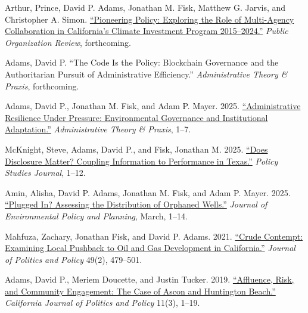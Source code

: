 \documentclass[12pt,letterpaper]{article}
\renewenvironment{itemize}{
  \begin{list}{}{
    \setlength{\leftmargin}{1.5em}
    \setlength{\itemsep}{0.25em}
    \setlength{\parskip}{0pt}
    \setlength{\parsep}{0.25em}
  }
}{
  \end{list}
}
\begin{document}
\begin{itemize}\leftmargin=2pt\itemindent=-15pt\leftmargin=2pt\itemindent=-15pt

    \item Arthur, Prince, David P. Adams, Jonathan M. Fisk, Matthew G. Jarvis, and Christopher A. Simon. \href{https://doi.org/10.1007/s11115-025-00586-3}{``Pioneering Policy: Exploring the Role of Multi-Agency Collaboration in California's Climate Investment Program 2015--2024.''} \emph{Public Organization Review}, forthcoming.

    \item Adams, David P. ``The Code Is the Policy: Blockchain Governance and the Authoritarian Pursuit of Administrative Efficiency.'' \emph{Administrative Theory \& Praxis}, forthcoming.

    \item Adams, David P., Jonathan M. Fisk, and Adam P. Mayer. 2025. \href{https://doi.org/10.1080/10841806.2025.2537600}{``Administrative Resilience Under Pressure: Environmental Governance and Institutional Adaptation.''} \emph{Administrative Theory \& Praxis}, 1--7.

    \item McKnight, Steve, Adams, David P., and Fisk, Jonathan M. 2025. \href{https://doi.org/10.1111/psj.70064}{``Does Disclosure Matter? Coupling Information to Performance in Texas.''} \emph{Policy Studies Journal}, 1--12.

    \item Amin, Alisha, David P. Adams, Jonathan M. Fisk, and Adam P. Mayer. 2025. \href{https://doi.org/10.1080/1523908X.2025.2480289}{``Plugged In? Assessing the Distribution of Orphaned Wells.''} \emph{Journal of Environmental Policy and Planning}, March, 1--14.

    \item Mahfuza, Zachary, Jonathan Fisk, and David P. Adams. 2021. \href{https://doi.org/10.1111/polp.12401}{``Crude Contempt: Examining Local Pushback to Oil and Gas Development in California.''} \emph{Journal of Politics and Policy} 49(2), 479--501.

    \item Adams, David P., Meriem Doucette, and Justin Tucker. 2019. \href{https://escholarship.org/uc/item/2mz2n6qk}{``Affluence, Risk, and Community Engagement: The Case of Ascon and Huntington Beach.''} \emph{California Journal of Politics and Policy} 11(3), 1--19.   

\end{itemize}
\end{document}
